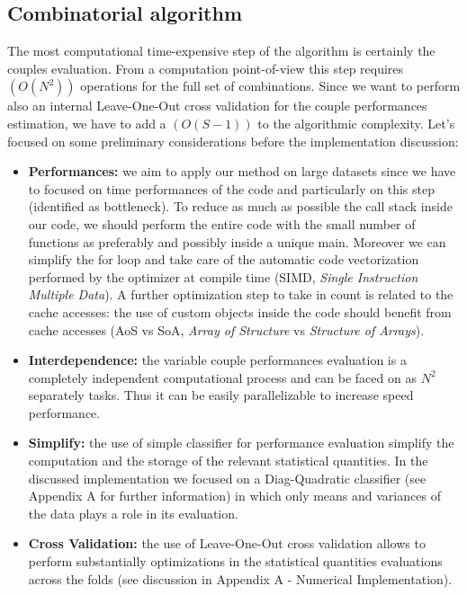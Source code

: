 \documentclass{standalone}
\begin{document}
\subsection[Pairs evaluation]{Combinatorial algorithm}\label{implementation:couples}

The most computational time-expensive step of the algorithm is certainly the couples evaluation.
From a computation point-of-view this step requires $(O(N^2))$ operations for the full set of combinations.
Since we want to perform also an internal Leave-One-Out cross validation for the couple performances estimation, we have to add a $(O(S-1))$ to the algorithmic complexity.
Let's focused on some preliminary considerations before the implementation discussion:

\begin{itemize}

\item \textbf{Performances:} we aim to apply our method on large datasets since we have to focused on time performances of the code and particularly on this step (identified as bottleneck).
To reduce as much as possible the call stack inside our code, we should perform the entire code with the small number of functions as preferably and possibly inside a unique main.
Moreover we can simplify the for loop and take care of the automatic code vectorization performed by the optimizer at compile time (SIMD, \emph{Single Instruction Multiple Data}).
A further optimization step to take in count is related to the cache accesses: the use of custom objects inside the code should benefit from cache accesses (AoS vs SoA, \emph{Array of Structure} vs \emph{Structure of Arrays}).

\item \textbf{Interdependence:} the variable couple performances evaluation is a completely independent computational process and can be faced on as $N^2$ separately tasks.
Thus it can be easily parallelizable to increase speed performance.

\item \textbf{Simplify:} the use of simple classifier for performance evaluation simplify the computation and the storage of the relevant statistical quantities.
In the discussed implementation we focused on a Diag-Quadratic classifier (see Appendix A for further information) in which only means and variances of the data plays a role in its evaluation.

\item \textbf{Cross Validation:} the use of Leave-One-Out cross validation allows to perform substantially optimizations in the statistical quantities evaluations across the folds (see discussion in Appendix A - Numerical Implementation).


\end{itemize}
\end{document}
